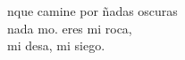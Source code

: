 \begin{cancion}[Mi roca][Ixcís]%
	nque camine por ñadas oscuras \\
	nada mo.  eres mi roca,\\
	mi desa, mi siego.\\
\end{cancion}%
